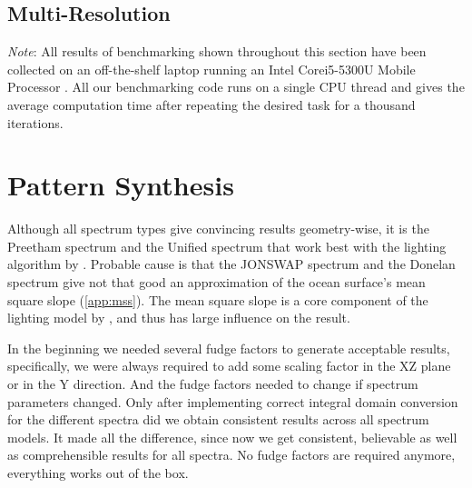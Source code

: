 

%
%
\subsection{Multi-Resolution}
\emph{Note}: All results of benchmarking shown throughout this section
have been collected on an off-the-shelf laptop running an Intel\textregistered
Core\texttrademark i5-5300U Mobile Processor \citep{intel:5300u}.
All our benchmarking code runs on a single CPU thread and gives the average
computation time after repeating the desired task for a thousand iterations.
%
\section{Pattern Synthesis}
\label{sec:results:synthesis}
Although all spectrum types give convincing results geometry-wise, it is the
Preetham spectrum and the Unified spectrum that work best with the lighting
algorithm by \cite{article:oceanlighting}. Probable cause is that the JONSWAP
spectrum and the Donelan spectrum give not that good an approximation of the
ocean surface's mean square slope (\ref{app:mss}). The mean square slope is a
core component of the lighting model by \cite{article:oceanlighting}, and thus
has large influence on the result.

In the beginning we needed several fudge factors to generate acceptable results,
specifically, we were always required to add some scaling factor in the XZ plane
or in the Y direction. And the fudge factors needed to change if spectrum
parameters changed.
Only after implementing correct integral domain conversion for the different
spectra did we obtain consistent results across all spectrum models. It made all
the difference, since now we get consistent, believable as well as
comprehensible results for all spectra. No fudge factors are required anymore,
everything works out of the box.

